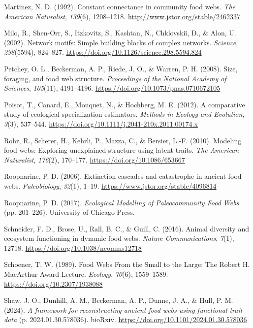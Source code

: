\documentclass[
]{article}
\newlength{\cslhangindent}
\newenvironment{CSLReferences}[2] %
 {\begin{list}{}{%
  \setlength{\itemindent}{0pt}
  \setlength{\leftmargin}{0pt}
  \setlength{\parsep}{0pt}
  \ifodd #1
   \setlength{\leftmargin}{\cslhangindent}
   \setlength{\itemindent}{-1\cslhangindent}
  \fi
  \setlength{\itemsep}{#2\baselineskip}}}
 {\end{list}}
\begin{document}
\begin{CSLReferences}{1}{0}
Martinez, N. D. (1992). Constant connectance in community food webs.
\emph{The American Naturalist}, \emph{139}(6), 1208--1218.
\url{http://www.jstor.org/stable/2462337}

Milo, R., Shen-Orr, S., Itzkovitz, S., Kashtan, N., Chklovskii, D., \&
Alon, U. (2002). Network motifs: Simple building blocks of complex
networks. \emph{Science}, \emph{298}(5594), 824--827.
\url{https://doi.org/10.1126/science.298.5594.824}

Petchey, O. L., Beckerman, A. P., Riede, J. O., \& Warren, P. H. (2008).
Size, foraging, and food web structure. \emph{Proceedings of the
National Academy of Sciences}, \emph{105}(11), 4191--4196.
\url{https://doi.org/10.1073/pnas.0710672105}

Poisot, T., Canard, E., Mouquet, N., \& Hochberg, M. E. (2012). A
comparative study of ecological specialization estimators. \emph{Methods
in Ecology and Evolution}, \emph{3}(3), 537--544.
\url{https://doi.org/10.1111/j.2041-210x.2011.00174.x}

Rohr, R., Scherer, H., Kehrli, P., Mazza, C., \& Bersier, L.-F. (2010).
Modeling food webs: Exploring unexplained structure using latent traits.
\emph{The American Naturalist}, \emph{176}(2), 170--177.
\url{https://doi.org/10.1086/653667}

Roopnarine, P. D. (2006). Extinction cascades and catastrophe in ancient
food webs. \emph{Paleobiology}, \emph{32}(1), 1--19.
\url{https://www.jstor.org/stable/4096814}

Roopnarine, P. D. (2017). \emph{Ecological Modelling of Paleocommunity
Food Webs} (pp. 201--226). University of Chicago Press.

Schneider, F. D., Brose, U., Rall, B. C., \& Guill, C. (2016). Animal
diversity and ecosystem functioning in dynamic food webs. \emph{Nature
Communications}, \emph{7}(1), 12718.
\url{https://doi.org/10.1038/ncomms12718}

Schoener, T. W. (1989). Food Webs From the Small to the Large: The
Robert H. MacArthur Award Lecture. \emph{Ecology}, \emph{70}(6),
1559--1589. \url{https://doi.org/10.2307/1938088}

Shaw, J. O., Dunhill, A. M., Beckerman, A. P., Dunne, J. A., \& Hull, P.
M. (2024). \emph{A framework for reconstructing ancient food webs using
functional trait data} (p. 2024.01.30.578036). bioRxiv.
\url{https://doi.org/10.1101/2024.01.30.578036}


\end{CSLReferences}
\end{document}

